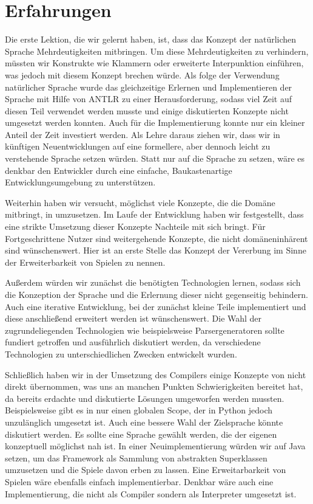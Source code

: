 
\chapter{Erfahrungen}
\label{cha:erfahrungen}

Die erste Lektion, die wir gelernt haben, ist, dass das Konzept der natürlichen Sprache Mehrdeutigkeiten mitbringen. Um diese Mehrdeutigkeiten zu verhindern, müssten wir Konstrukte wie Klammern oder erweiterte Interpunktion einführen, was jedoch mit diesem Konzept brechen würde. Als folge der Verwendung natürlicher Sprache wurde das gleichzeitige Erlernen und Implementieren der Sprache mit Hilfe von ANTLR zu einer Herausforderung, sodass viel Zeit auf diesen Teil verwendet werden musste und einige diskutierten Konzepte nicht umgesetzt werden konnten. Auch für die Implementierung konnte nur ein kleiner Anteil der Zeit investiert werden. Als Lehre daraus ziehen wir, dass wir in künftigen Neuentwicklungen auf eine formellere, aber dennoch leicht zu verstehende Sprache setzen würden. Statt nur auf die Sprache zu setzen, wäre es denkbar den Entwickler durch eine einfache, Baukastenartige Entwicklungsumgebung zu unterstützen.

Weiterhin haben wir versucht, möglichst viele Konzepte, die die Domäne mitbringt, in \dg umzusetzen. Im Laufe der Entwicklung haben wir festgestellt, dass eine strikte Umsetzung dieser Konzepte Nachteile mit sich bringt. Für Fortgeschrittene Nutzer sind weitergehende Konzepte, die nicht domäneninhärent sind wünschenswert. Hier ist an erste Stelle das Konzept der Vererbung im Sinne der Erweiterbarkeit von Spielen zu nennen.


Außerdem würden wir zunächst die benötigten Technologien lernen, sodass sich die Konzeption der Sprache und die Erlernung dieser nicht gegenseitig behindern. Auch eine iterative Entwicklung, bei der zunächst kleine Teile implementiert und diese anschließend erweitert werden ist wünschenswert. Die Wahl der zugrundeliegenden Technologien wie beispielsweise Parsergeneratoren sollte fundiert getroffen und ausführlich diskutiert werden, da verschiedene Technologien zu unterschiedlichen Zwecken entwickelt wurden.

Schließlich haben wir in der Umsetzung des Compilers einige Konzepte von \dg nicht direkt übernommen, was uns an manchen Punkten Schwierigkeiten bereitet hat, da bereits erdachte und diskutierte Lösungen umgeworfen werden mussten. Beispielsweise gibt es in \dg nur einen globalen Scope, der in Python jedoch unzulänglich umgesetzt ist. Auch eine bessere Wahl der Zielsprache könnte diskutiert werden. Es sollte eine Sprache gewählt werden, die der eigenen konzeptuell möglichst nah ist. In einer Neuimplementierung würden wir auf Java setzen, um das Framework als Sammlung von abstrakten Superklassen umzusetzen und die Spiele davon erben zu lassen. Eine Erweitarbarkeit von Spielen wäre ebenfalls einfach implementierbar. Denkbar wäre auch eine Implementierung, die nicht als Compiler sondern als Interpreter umgesetzt ist.
    
    \newpage